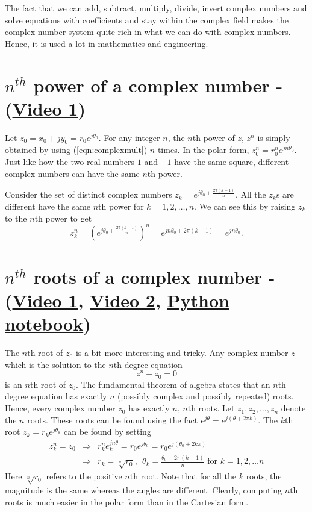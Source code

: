 The fact that we can add, subtract, multiply, divide, invert complex numbers and solve equations with coefficients and stay within the complex field makes the complex number system quite rich in what we can do with complex numbers. Hence, it is used a lot in mathematics and engineering.


\section{$n^{th}$ power of a complex number - (\href{https://youtu.be/um6i6G5WaU8}{Video 1})}
\label{sec:nthpower}

Let $z_0 = x_0 + j y_0 = r_0  e^{j \theta_0}$. For any integer $n$, the $n$th power of $z$, $z^n$ is simply obtained by
using (\ref{eqn:complexmult}) $n$ times. In the polar form, $z_0^n = r_0^n e^{j n \theta_0}$. Just like how the two real
numbers $1$ and $-1$ have the same square, different complex numbers can have the same $n$th power.

Consider the set of distinct complex numbers $z_k = e^{j \theta_0 + \frac{2 \pi (k-1)}{n}}$. All the $z_k$s are different have the same $n$th power for $k=1,2,\ldots,n$. We can see this by raising $z_k$ to the $n$th power to get
\begin{equation}
z_k^n = \left(e^{j \theta_0 + \frac{2 \pi (k-1)}{n}}\right)^n = e^{j n \theta_0 + 2 \pi (k-1)} = e^{j n \theta_0}.
\end{equation}

\section{$n^{th}$ roots of a complex number -
(\href{https://youtu.be/MOudd6zG72Q}{Video 1},
\href{https://youtu.be/DKW7Fkvb4JA}{Video 2},
\href{https://colab.research.google.com/drive/1SQh4WxEiAz03-S8pS9OXiNRmV2Go5bRh?usp=sharing}{Python notebook})}
\label{sec:nthroots}
The $n$th root of $z_0$ is a bit more interesting and tricky. Any complex number $z$ which is the solution to the $n$th degree equation
\[
z^n - z_0 = 0
\]
is an $n$th root of $z_0$. The fundamental theorem of algebra states that an $n$th degree equation has exactly $n$ (possibly complex and possibly repeated) roots. Hence, every complex number $z_0$ has exactly $n$, $n$th roots.  Let $z_1,z_2,\ldots,z_n$ denote the $n$ roots.
These roots can be found using
the fact $e^{j \theta} = e^{j (\theta + 2 \pi k)}$.
The $k$th root $z_k = r_k e^{j \theta_k}$ can be found by setting
\begin{eqnarray}
\nonumber
z_k^n = z_0 & \Rightarrow & r_k^n e_k^{jn\theta} = r_0 e^{j\theta_0} = r_0 e^{j(\theta_0 +2 k \pi)} \\
\label{eq:nthroot}
& \Rightarrow & r_k = \sqrt[n]{r_0}, \ \ \theta_k = \frac{\theta_0+2 \pi (k-1)}{n} \mbox{ for } k = 1,2,\ldots n
\end{eqnarray}
Here $\sqrt[n]{r_0}$ refers to the positive $n$th root.
Note that for all the $k$ roots, the magnitude is the same whereas the angles are different.
Clearly, computing $n$th roots is much easier in the polar form than in the Cartesian form.

